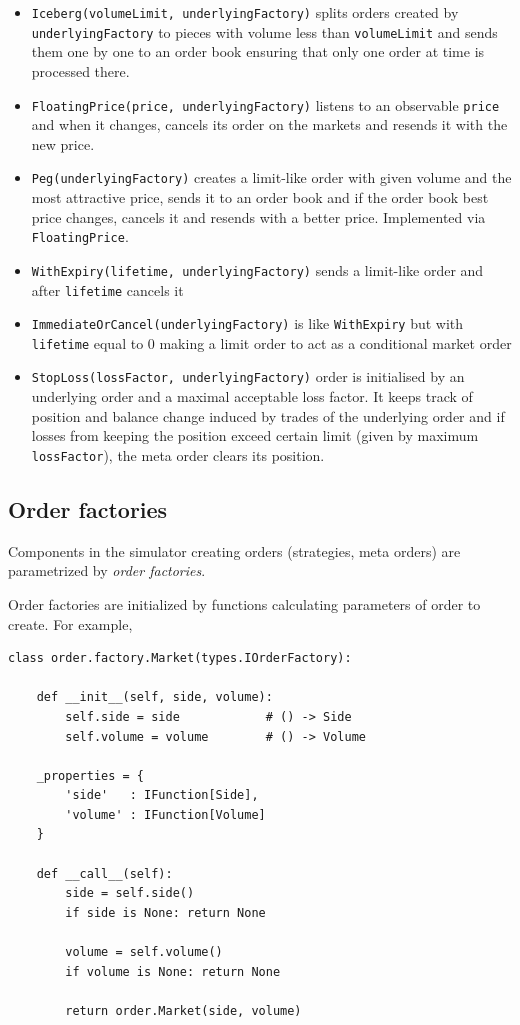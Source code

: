 \documentclass[a4paper,11pt]{article}
\begin{document}
\begin{itemize}
  \item \texttt{Iceberg(volumeLimit, underlyingFactory)} splits orders created by \texttt{underlyingFactory} to pieces with volume less than \texttt{volumeLimit} and sends them one by one to an order book ensuring that only one order at time is processed there.
  \item \texttt{FloatingPrice(price, underlyingFactory)} listens to an observable \texttt{price} and when it changes, cancels its order on the markets and resends it with the new price.  
  \item \texttt{Peg(underlyingFactory)} creates a limit-like order with given volume and the most attractive price, sends it to an order book and if the order book best price changes, cancels it and resends with a better price. Implemented via \texttt{FloatingPrice}.
  \item \texttt{WithExpiry(lifetime, underlyingFactory)} sends a limit-like order and after \texttt{lifetime} cancels it
  \item \texttt{ImmediateOrCancel(underlyingFactory)} is like \texttt{WithExpiry} but with \texttt{lifetime} equal to 0 making a limit order to act as a conditional market order
  \item \texttt{StopLoss(lossFactor, underlyingFactory)} order is initialised by an underlying order and a maximal acceptable loss factor.
      It keeps track of position and balance change induced by trades of the underlying order and
      if losses from keeping the position exceed certain limit (given by maximum \texttt{lossFactor}),
      the meta order clears its position.
  
\end{itemize}

\subsection{Order factories}\label{order-factories}

Components in the simulator creating orders (strategies, meta orders)
are parametrized by \emph{order factories}.

Order factories are initialized by functions calculating parameters of
order to create. For example,

\begin{verbatim}
class order.factory.Market(types.IOrderFactory):

    def __init__(self, side, volume):
        self.side = side            # () -> Side
        self.volume = volume        # () -> Volume

    _properties = {
        'side'   : IFunction[Side],
        'volume' : IFunction[Volume]
    }

    def __call__(self):
        side = self.side()
        if side is None: return None

        volume = self.volume()
        if volume is None: return None

        return order.Market(side, volume)
\end{verbatim}
\end{document}
